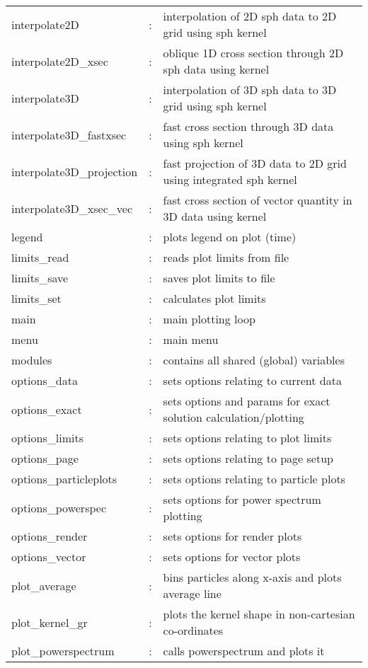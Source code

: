 \documentclass[a4paper,12pt]{article}
\begin{document}
\begin{tabular}{lcp{}}
interpolate2D	 & : & interpolation of 2D sph data to 2D grid using sph kernel  \\   
interpolate2D\_xsec & : & oblique 1D cross section through 2D sph data using kernel\\
interpolate3D	 & : & interpolation of 3D sph data to 3D grid using sph kernel\\
interpolate3D\_fastxsec   & : & fast cross section through 3D data using sph kernel\\
interpolate3D\_projection & : & fast projection of 3D data to 2D grid using integrated sph kernel\\
interpolate3D\_xsec\_vec   & : & fast cross section of vector quantity in 3D data using kernel\\
legend		       & : & plots legend on plot (time)\\
limits\_read              & : & reads plot limits from file\\
limits\_save              & : & saves plot limits to file\\
limits\_set               & : & calculates plot limits\\
main               & : & main plotting loop\\
menu               & : & main menu\\
modules		 & : & contains all shared (global) variables\\
options\_data       & : & sets options relating to current data\\
options\_exact	 & : & sets options and params for exact solution calculation/plotting\\
options\_limits     & : & sets options relating to plot limits\\
options\_page       & : & sets options relating to page setup\\
options\_particleplots & : & sets options relating to particle plots\\
options\_powerspec  & : & sets options for power spectrum plotting\\
options\_render	 & : & sets options for render plots\\
options\_vector	 & : & sets options for vector plots\\
plot\_average	 & : & bins particles along x-axis and plots average line\\
plot\_kernel\_gr     & : & plots the kernel shape in non-cartesian co-ordinates\\
plot\_powerspectrum & : & calls powerspectrum and plots it\\

\end{tabular}
\end{document}

